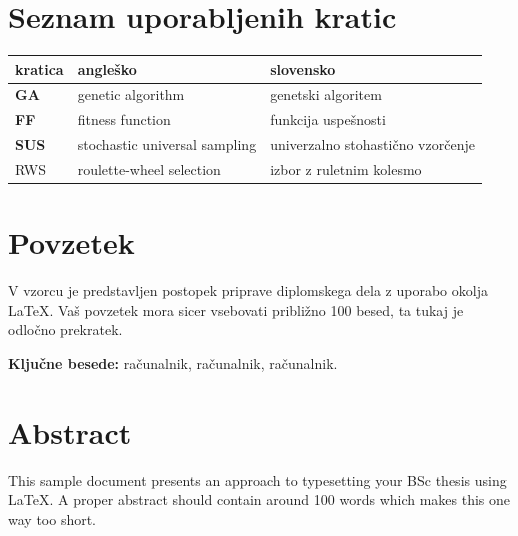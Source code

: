 \documentclass[a4paper, 12pt]{book}
\newcommand{\tkeywords}{računalnik, računalnik, računalnik}
\newcommand{\clearemptydoublepage}{\newpage{\pagestyle{empty}\cleardoublepage}}
\begin{document}
\clearemptydoublepage

\def\thepage{}%
\tableofcontents{}


\clearemptydoublepage


\chapter*{Seznam uporabljenih kratic}

\begin{tabular}{l|l|l}
  {\bf kratica} & {\bf angleško} & {\bf slovensko} \\ \hline
  {\bf GA} & genetic algorithm & genetski algoritem \\
  {\bf FF} &  fitness function & funkcija uspešnosti \\
  {\bf SUS} & stochastic universal sampling & univerzalno stohastično vzorčenje \\
  RWS &  roulette-wheel selection & izbor z ruletnim kolesmo \\
\end{tabular}



\clearemptydoublepage

\chapter*{Povzetek}
V vzorcu je predstavljen postopek priprave diplomskega dela z uporabo okolja \LaTeX. Vaš povzetek mora sicer vsebovati približno 100 besed, ta tukaj je odločno prekratek.
\bigskip

\noindent\textbf{Ključne besede:} \tkeywords.
\clearemptydoublepage

\chapter*{Abstract}
This sample document presents an approach to typesetting your BSc thesis using \LaTeX. A proper abstract should contain around 100 words which makes this one way too short.
\bigskip
\end{document}
